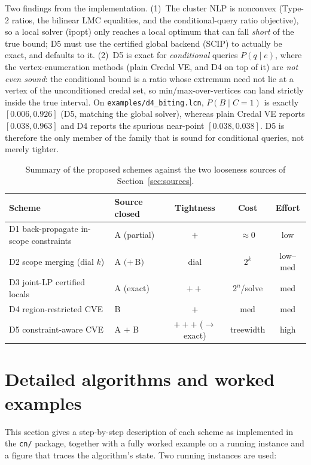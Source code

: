 \documentclass[11pt]{article}
\begin{document}
Two findings from the implementation. (1)~The cluster NLP is nonconvex (Type-2 ratios, the
bilinear LMC equalities, and the conditional-query ratio objective), so a local solver
(ipopt) only reaches a local optimum that can fall \emph{short} of the true bound; D5 must
use the certified global backend (SCIP) to actually be exact, and defaults to it. (2)~D5 is
exact for \emph{conditional} queries $P(q\mid e)$, where the vertex-enumeration methods
(plain Credal VE, and D4 on top of it) are \emph{not even sound}: the conditional bound is a
ratio whose extremum need not lie at a vertex of the unconditioned credal set, so
min/max-over-vertices can land strictly inside the true interval. On
\texttt{examples/d4\_biting.lcn}, $P(B\mid C{=}1)$ is exactly $[0.006,0.926]$ (D5, matching
the global solver), whereas plain Credal VE reports $[0.038,0.963]$ and D4 reports the
spurious near-point $[0.038,0.038]$. D5 is therefore the only member of the family that is
sound for conditional queries, not merely tighter.

\begin{table}[t]
  \centering
  \begin{tabular}{llccc}
    \toprule
    Scheme & Source closed & Tightness & Cost & Effort \\
    \midrule
    D1 back-propagate in-scope constraints & A (partial) & $+$       & $\approx 0$       & low \\
    D2 scope merging (dial $k$)            & A $(+\,$B$)$ & dial      & $2^k$             & low--med \\
    D3 joint-LP certified locals           & A (exact)    & $++$      & $2^n$/solve       & med \\
    D4 region-restricted CVE               & B            & $+$       & med               & med \\
    D5 constraint-aware CVE                & A $+$ B       & $+{+}{+}$ ($\to$exact) & treewidth & high \\
    \bottomrule
  \end{tabular}
  \caption{Summary of the proposed schemes against the two looseness sources of
    Section~\ref{sec:sources}.}
\end{table}

\section{Detailed algorithms and worked examples}\label{sec:detailed}

This section gives a step-by-step description of each scheme as implemented in the
\texttt{cn/} package, together with a fully worked example on a running instance and a figure
that traces the algorithm's state. Two running instances are used:
\end{document}
